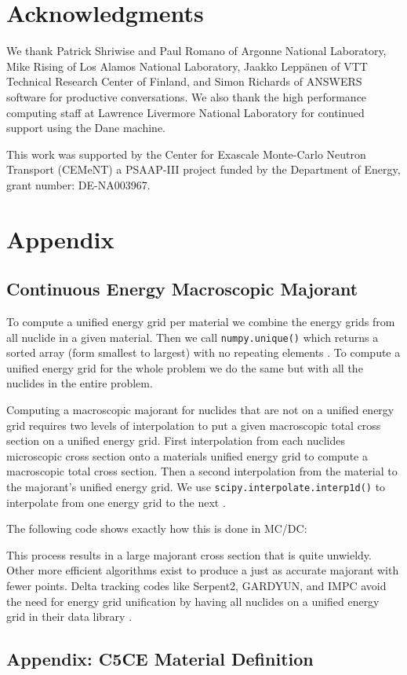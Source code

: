 \section*{Acknowledgments}
We thank Patrick Shriwise and Paul Romano of Argonne National Laboratory, Mike Rising of Los Alamos National Laboratory, Jaakko Leppänen of VTT Technical Research Center of Finland, and Simon Richards of ANSWERS software for productive conversations.
We also thank the high performance computing staff at Lawrence Livermore National Laboratory for continued support using the Dane machine. 

This work was supported by the Center for Exascale Monte-Carlo Neutron Transport (CEMeNT) a PSAAP-III project funded by the Department of Energy, grant number: DE-NA003967.

\section*{Appendix}

\subsection*{Continuous Energy Macroscopic Majorant}
\label{app:majorant}

To compute a unified energy grid per material we combine the energy grids from all nuclide in a given material. 
Then we call \texttt{numpy.unique()} which returns a sorted array (form smallest to largest) with no repeating elements \cite{van_der_walt_numpy_2011}.
To compute a unified energy grid for the whole problem we do the same but with all the nuclides in the entire problem.

Computing a macroscopic majorant for nuclides that are not on a unified energy grid requires two levels of interpolation to put a given macroscopic total cross section on a unified energy grid.
First interpolation from each nuclides microscopic cross section onto a materials unified energy grid to compute a macroscopic total cross section.
Then a second interpolation from the material to the majorant's unified energy grid.
We use \texttt{scipy.interpolate.interp1d()} to interpolate from one energy grid to the next \cite{2020SciPy-NMeth:a}. 

The following code shows exactly how this is done in MC/DC:



This process results in a large majorant cross section that is quite unwieldy.
Other more efficient algorithms exist to produce a just as accurate majorant with fewer points.
Delta tracking codes like Serpent2, GARDYUN, and IMPC avoid the need for energy grid unification by having all nuclides on a unified energy grid in their data library \cite{leppanen_2010_burnup, molnar_gpu_based_2019, fang_development_2022}.


\newpage

\subsection*{Appendix: C5CE Material Definition}
\label{app:c5ce_mat}
